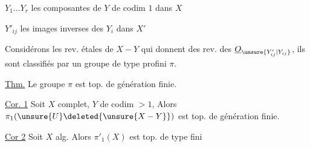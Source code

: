 $Y_1\ldots Y_r$ les composantes de $Y$ de codim $1$ dans $X$

$Y'_{ij}$ les images inverses des $Y_i$ dans $X'$

Considérons les rev. étales de $X-Y$ qui
donnent des rev.  des $\underline O_{\unsure{Y'_{ij}|Y_{ij}}}$,
ils sont classifiés par un groupe de type profini $\pi$.

\uline{Thm.} Le groupe $\pi$ est top. de génération finie.

\uline{Cor. 1} Soit $X$  complet,
$Y$ de codim $>1$, 
Alors $\pi_1(\unsure{U}\deleted{\unsure{X-Y}})$
est top. de génération finie.

\uline{Cor 2} Soit $X$  alg.
Alors $\pi'_1(X)$ est top. de type fini

